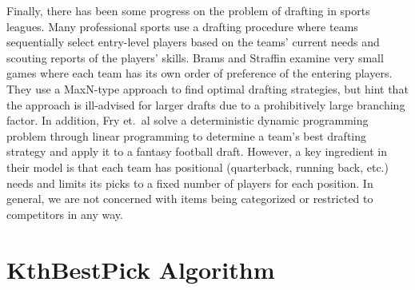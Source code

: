 \documentclass[letterpaper]{article}
\numberwithin{equation}{section}
\numberwithin{theorem}{section}
\numberwithin{lemma}{section}
\numberwithin{df}{section}
\begin{document}
Finally, there has been some progress on the problem of drafting in sports leagues.  Many professional sports use a drafting procedure where teams sequentially select entry-level players based on the teams' current needs and scouting reports of the players' skills.  Brams and Straffin \cite{PrisonAndDrafting} examine very small games where each team has its own order of preference of the entering players.  They use a MaxN-type approach to find optimal drafting strategies, but hint that the approach is ill-advised for larger drafts due to a prohibitively large branching factor.  In addition, Fry et.~al \cite{SportsDrafting} solve a deterministic dynamic programming problem through linear programming to determine a team's best drafting strategy and apply it to a fantasy football draft.  However, a key ingredient in their model is that each team has positional (quarterback, running back, etc.) needs and limits its picks to a fixed number of players for each position.  In general, we are not concerned with items being categorized or restricted to competitors in any way.

\section{KthBestPick Algorithm}
\label{sec:drafting}




\end{document}
